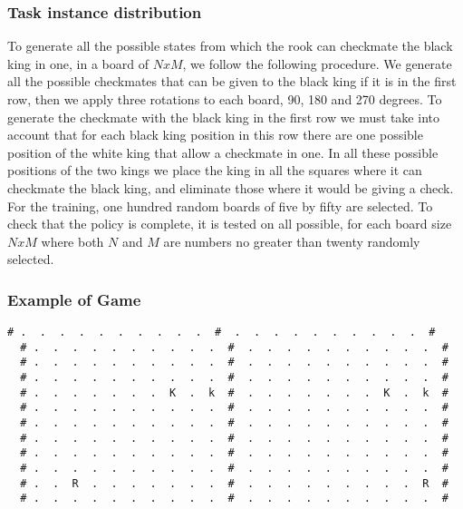 \documentclass[a4paper]{article}
\begin{document}
\subsubsection{Task instance distribution}
To generate all the possible states from which the rook can checkmate the black king in one, in a board of $NxM$, we follow the following procedure. We generate all the possible checkmates that can be given to the black king if it is in the first row, then we apply three rotations to each board, 90, 180 and 270 degrees. To generate the checkmate with the black king in the first row we must take into account that for each black king position in this row there are one possible position of the white king that allow a checkmate in one. In all these possible positions of the two kings we place the king in all the squares where it can checkmate the black king, and eliminate those where it would be giving a check. For the training, one hundred random boards of five by fifty are selected. To check that the policy is complete, it is tested on all possible, for each board size $NxM$ where both $N$ and $M$ are numbers no greater than twenty randomly selected.


\subsubsection{Example of Game}
\begin{Verbatim}[fontsize=\footnotesize]
  # .  .  .  .  .  .  .  .  .  .  #  .  .  .  .  .  .  .  .  .  .  #
  # .  .  .  .  .  .  .  .  .  .  #  .  .  .  .  .  .  .  .  .  .  #
  # .  .  .  .  .  .  .  .  .  .  #  .  .  .  .  .  .  .  .  .  .  #
  # .  .  .  .  .  .  .  .  .  .  #  .  .  .  .  .  .  .  .  .  .  #
  # .  .  .  .  .  .  .  K  .  k  #  .  .  .  .  .  .  .  K  .  k  #
  # .  .  .  .  .  .  .  .  .  .  #  .  .  .  .  .  .  .  .  .  .  #
  # .  .  .  .  .  .  .  .  .  .  #  .  .  .  .  .  .  .  .  .  .  #
  # .  .  .  .  .  .  .  .  .  .  #  .  .  .  .  .  .  .  .  .  .  #
  # .  .  .  .  .  .  .  .  .  .  #  .  .  .  .  .  .  .  .  .  .  #
  # .  .  .  .  .  .  .  .  .  .  #  .  .  .  .  .  .  .  .  .  .  #
  # .  .  R  .  .  .  .  .  .  .  #  .  .  .  .  .  .  .  .  .  R  #
  # .  .  .  .  .  .  .  .  .  .  #  .  .  .  .  .  .  .  .  .  .  #
\end{Verbatim}

\newpage
\end{document}
